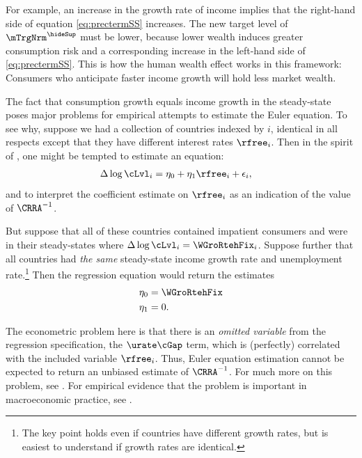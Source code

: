 \documentclass{econark}
\begin{document}
For example, an increase in the growth rate of income implies that the
right-hand side of equation \eqref{eq:prectermSS} increases.  The new target level of
$\mTrgNrm^{\hideSup}$ must be lower, because lower wealth induces greater consumption risk and a corresponding increase in the left-hand side of \eqref{eq:prectermSS}.  This is how the human wealth effect works in this framework:
Consumers who anticipate faster income growth will hold less market wealth.

The fact that consumption growth equals income growth in the
steady-state poses major problems for empirical attempts to estimate
the Euler equation.  To see why, suppose we had a collection of
countries indexed by $i$, identical in all respects except that
they have different interest rates $\rfree_{i}$.
Then in the spirit of \cite{hallSubstitution}, one might be
tempted to estimate an equation:
\begin{equation}\begin{gathered}\begin{aligned}
        \Delta \log \cLvl_{i} & =  \eta_{0} + \eta_{1} \rfree_{i}+\epsilon_{i},
\end{aligned}\end{gathered}\end{equation}
and to interpret the coefficient estimate on $\rfree_{i}$ as an indication
of the value of $\CRRA^{-1}$.

But suppose that all of these countries contained impatient consumers
and were in their steady-states where $\Delta \log \cLvl_{i} = \WGroRtehFix_{i}$.
Suppose further
that all countries had {\it the same} steady-state income growth rate and
unemployment rate.\footnote{The key point holds even if countries have different
growth rates, but is easiest to understand if growth rates are identical.}
Then the regression equation would return the estimates
\begin{equation}\begin{gathered}\begin{aligned}
        \eta_{0} & =  \WGroRtehFix  \\
        \eta_{1} & =  0.
\end{aligned}\end{gathered}\end{equation}

The econometric problem here is that there is an {\it omitted
variable} from the regression specification, the $\urate \cGap$ term, which is (perfectly) correlated with the included
variable $\rfree_{i}$.  Thus, Euler equation estimation cannot be expected to
return an unbiased estimate of $\CRRA^{-1}$.  For much more on this
problem, see \cite{carroll:death}.  For empirical evidence
that the problem is important in macroeconomic practice, see \cite{ParkerPrestonPrecaution}.
\end{document}
